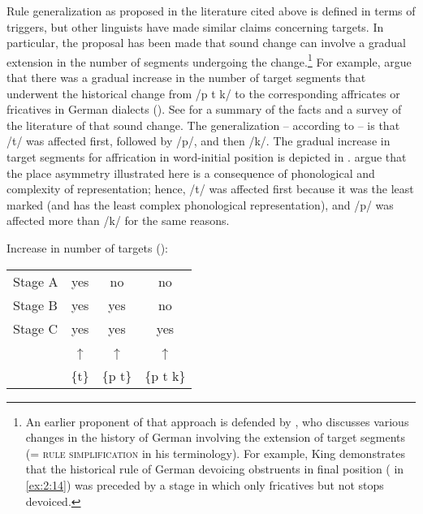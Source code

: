 \begin{xlist}
\begin{xlist}
Rule generalization as proposed in the literature cited above is defined in terms of triggers, but other linguists have made similar claims concerning targets. In particular, the proposal has been made that sound change can involve a gradual extension in the number of segments undergoing the change.\footnote{An earlier proponent of that approach is defended by \citet[58--63]{King1969}, who discusses various changes in the history of German involving the extension of target segments (= \textsc{rule simplification} in his terminology). For example, King demonstrates that the historical rule of German devoicing obstruents in final position ( in \ref{ex:2:14}) was preceded by a stage in which only fricatives but not stops devoiced.} For example, \citet{DavisSalmons1999} argue that there was a gradual increase in the number of target segments that underwent the historical change from /p t k/ to the corresponding affricates or fricatives in German dialects (). See \citet[82--95]{Braune2004} for a summary of the facts and a survey of the literature of that sound change. The generalization -- according to \citet{DavisSalmons1999} -- is that /t/ was affected first, followed by /p/, and then /k/. The gradual increase in target segments for affrication in word-initial position is depicted in . \citet{DavisSalmons1999} argue that the place asymmetry illustrated here is a consequence of phonological  and complexity of representation; hence, /t/ was affected first because it was the least marked (and has the least complex phonological representation), and /p/ was affected more than /k/ for the same reasons.

\ea%
\label{ex:2:29}Increase in number of targets ():
\begin{tabular}{@{}lccc@{}}
  Stage A &  yes   &    no   &     no   \\
  Stage B &  yes   &    yes  &     no   \\
  Stage C &  yes   &    yes  &     yes  \\
          &   ↑    &     ↑   &      ↑   \\
          & \{t\}  & \{p t\} & \{p t k\}\\
\end{tabular}
\z 


\end{xlist}
\end{xlist}
